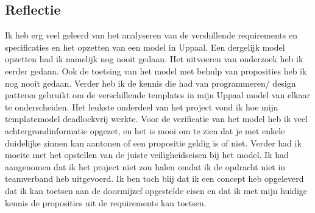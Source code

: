 \subsection{Reflectie}

Ik heb erg veel geleerd van het analyseren van de vershillende requirements en specificaties en het opzetten van een model in Uppaal. Een dergelijk model opzetten had ik namelijk nog nooit gedaan. Het uitvoeren van onderzoek heb ik eerder gedaan. Ook de toetsing van het model met behulp van proposities heb ik nog nooit gedaan. Verder heb ik de kennis die had van programmeren/ design pattersn gebruikt om de verschillende templates in mijn Uppaal model van elkaar te onderscheiden. Het leukste onderdeel van het project vond ik hoe mijn templatemodel deadlockvrij werkte. Voor de verificatie van het model heb ik veel achtergrondinformatie opgezet, en het is mooi om te zien dat je met enkele duidelijke zinnen kan aantonen of een propositie geldig is of niet.  Verder had ik moeite met het opstellen van de juiste veiligheidseisen bij het model. Ik had aangenomen dat ik het project niet zou halen omdat ik de opdracht niet in teamverband heb uitgevoerd. Ik ben toch blij dat ik een concept heb opgeleverd dat ik kan toetsen aan de doormijzef opgestelde eisen en dat ik met mijn huidige kennis de proposities uit de requirements kan toetsen.
